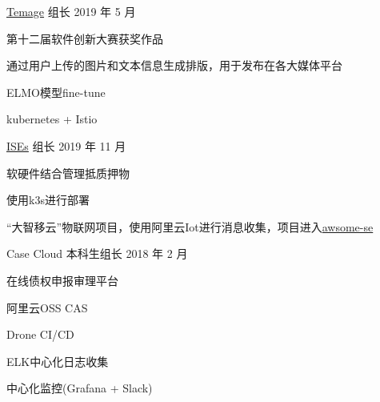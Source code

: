 

\begin{cventries}

  \cventry
    {} %
    {\href{https://github.com/wangtianxia-sjtu/Temage}{Temage}} %
    {组长} %
    {2019 年 5 月} %
    {
      \begin{cvitems} %
        \item 第十二届软件创新大赛获奖作品
        \item 通过用户上传的图片和文本信息生成排版，用于发布在各大媒体平台
        \item ELMO模型fine-tune
        \item kubernetes + Istio
      \end{cvitems}
    }

  \cventry
    {} %
    {\href{https://github.com/tx19980520/ISEs}{ISEs}} %
    {组长} %
    {2019 年 11 月} %
    {
      \begin{cvitems} %
        \item 软硬件结合管理抵质押物
        \item 使用k3s进行部署
        \item “大智移云”物联网项目，使用阿里云Iot进行消息收集，项目进入\href{https://github.com/SJTU-SE/awesome-se}{awsome-se}
      \end{cvitems}
    }

  \cventry
    {} %
    {Case Cloud} %
    {本科生组长} %
    {2018 年 2 月} %
    {
      \begin{cvitems} %
        \item 在线债权申报审理平台
        \item 阿里云OSS CAS
        \item Drone CI/CD
        \item ELK中心化日志收集
        \item 中心化监控(Grafana + Slack)
      \end{cvitems}
    }


\end{cventries}
